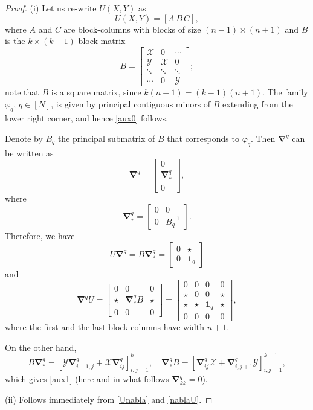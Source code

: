 \documentclass{amsart}
\theoremstyle{definition}
\theoremstyle{remark}
\numberwithin{equation}{section}
\numberwithin{theorem}{section}
\begin{document}
\begin{proof}
(i) Let us re-write $U(X,Y)$ as 
$$
U(X,Y)= \left [ A\, B\, C \right ],
$$
where $A$ and $C$ are block-columns with blocks of size $(n-1)\times(n+1)$
and $B$ is the $k\times (k-1)$ block matrix 
\[
B = \left [
\begin{array}{ccc}
 {{\mathcal X}} & 0 & \cdots \\
{{\mathcal Y}} & {{\mathcal X}} & 0  \\
 \ddots& \ddots &\ddots \\
 \cdots & 0 & {{\mathcal Y}}
\end{array}
\right ];
\]
note that $B$ is a square matrix, since $k(n-1)=(k-1)(n+1)$.
The family ${{\varphi}}_q$, $q\in [N]$, is given by 
principal contiguous minors of $B$ extending from the lower right 
corner, and hence \eqref{aux0} follows.

Denote by $B_q$ the principal submatrix of $B$ that corresponds to ${{\varphi}}_q$. Then
${\boldsymbol\nabla}^q$ can be written as
\[
{\boldsymbol\nabla}^q=\left [\begin{array}{c} 0\\ {\boldsymbol\nabla}^q_*\\ 0 \end{array}\right ],
\]
where 
$$
{\boldsymbol\nabla}^q_* = \left [\begin{array}{cc} 0 & 0 \\ 0  & B_q^{-1} \end{array}\right ].
$$
Therefore, we have
\begin{equation}\label{Unabla}
U {\boldsymbol\nabla}^q = B {\boldsymbol\nabla}^q_* = \left [\begin{array}{cc} 0 & \star \\ 0  & {\mathbf 1}_q \end{array}\right ]  
\end{equation}
and
\begin{equation}\label{nablaU}
{\boldsymbol\nabla}^q U=
\left [\begin{array}{ccc} 0 & 0 & 0\\ \star & {\boldsymbol\nabla}^q_* B & \star \\ 0 & 0 & 0 \end{array}\right ] =
\left [\begin{array}{cccc} 0& 0 & 0  & 0\\ 
\star & 0 & 0 & \star \\ \star & \star & {\mathbf 1}_q & \star\\
0& 0 & 0  & 0
\end{array}\right ],
\end{equation}
where the first and the last block columns have width $n+1$.

On the other hand,
\[
B {\boldsymbol\nabla}^q_*= \left [{{\mathcal Y}} {\boldsymbol\nabla}^q_{i-1,j} + {{\mathcal X}} {\boldsymbol\nabla}^q_{i j} \right ]_{i,j=1}^k, \quad 
{\boldsymbol\nabla}^q_* B= \left [{\boldsymbol\nabla}^q_{i j}{{\mathcal X}} + {\boldsymbol\nabla}^q_{i,j+1}{{\mathcal Y}} \right ]_{i,j=1}^{k-1},
\]
which gives \eqref{aux1} (here and in what follows ${\boldsymbol\nabla}^q_{kk}=0$).

(ii) Follows immediately from \eqref{Unabla} and \eqref{nablaU}.
\end{proof}
\end{document}
